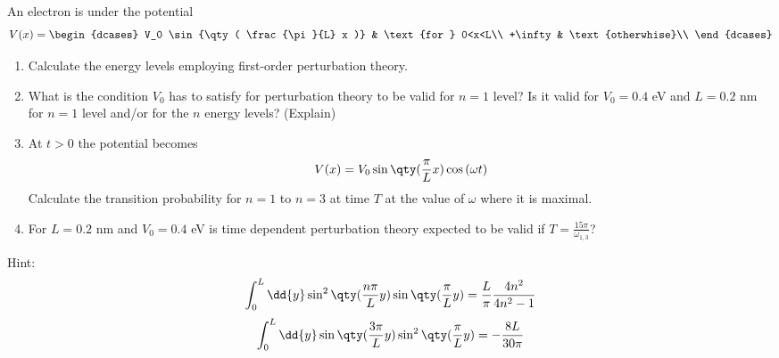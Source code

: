 \newpage

\begin{esercizio}
   An electron is under the potential
   \begin{equation*}
      V(x)=
      \begin{dcases}
         V_0 \sin{\qty( \frac{\pi}{L} x )} & \text{for } 0<x<L\\
         +\infty & \text{otherwhise}\\
      \end{dcases}
   \end{equation*}
   \begin{enumerate}[label=\alph*), leftmargin=0.6cm]
      \item Calculate the energy levels employing first-order perturbation theory.
      \item What is the condition $V_0$ has to satisfy for perturbation theory to be valid for $n=1$ level? Is it valid for $V_0=0.4$ eV and $L=0.2$ nm for $n=1$ level and/or for the $n$ energy levels? (Explain)
      \item At $t>0$ the potential becomes
      \begin{equation*}
         V(x)=V_0 \sin{\qty( \frac{\pi}{L} x )}\cos{(\omega t)}
      \end{equation*}
      Calculate the transition probability for $n=1$ to $n=3$ at time $T$ at the value of $\omega$ where it is maximal.
      \item For $L=0.2$ nm and $V_0=0.4$ eV is time dependent perturbation theory expected to be valid if $T=\frac{15 \pi}{\omega_{1,3}}$?
   \end{enumerate}
   Hint:
   \begin{gather*}
      \int_{0}^{L} \dd{y} \sin^2{\qty( \frac{n\pi}{L} y )} \sin{\qty( \frac{\pi}{L} y )}
      =\frac{L}{\pi} \frac{4n^2}{4n^2 - 1}
      \\[0.1cm]
      \int_{0}^{L} \dd{y} \sin{\qty( \frac{3\pi}{L} y )} \sin^2{\qty( \frac{\pi}{L} y )}
      =-\frac{8 L}{30 \pi}
   \end{gather*}
\end{esercizio}
